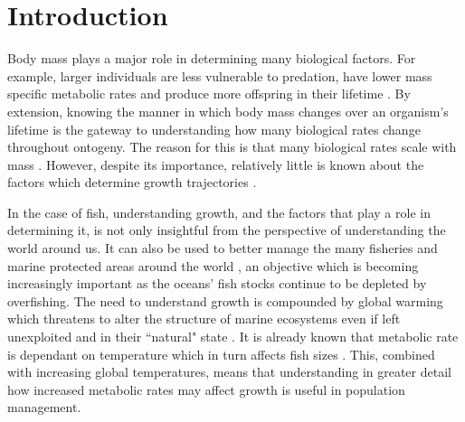 \documentclass[a4paper, 11pt, hidelinks]{article} %
\begin{document}
	
	\tableofcontents
	\newpage
	\linenumbers
\section{Introduction}


	Body mass plays a major role in determining many biological factors.  For example, larger individuals are less vulnerable to predation, have lower mass specific metabolic rates and produce more offspring in their lifetime \parencite{Peters1983, Barneche2018, Craig2006, Magnhagen2001, Hixon2014, Marshall2006}.
	By extension, knowing the manner in which body mass changes over an organism's lifetime is the gateway to understanding how many biological rates change throughout ontogeny.  The reason for this is that many biological rates scale with mass \parencite{Kleiber1932}.  However, despite its importance, relatively little is known about the factors which determine growth trajectories \parencite{Arendt2011, Marshall2019}.
	
	In the case of fish, understanding growth, and the factors that play a role in determining it, is not only insightful from the perspective of understanding the world around us.  It can also be used to better manage the many fisheries and marine protected areas around the world \parencite{Heino2013, Lester2009}, an objective which is becoming increasingly important as the oceans' fish stocks continue to be depleted by overfishing. 
	The need to understand growth is compounded by global warming which threatens to alter the structure of marine ecosystems even if left unexploited and in their ``natural" state \parencite{Bruno2018}.
	It is already known that metabolic rate is dependant on temperature which in turn affects fish sizes \parencite{Gillooly2001, Brown2004}.  This, combined with increasing global temperatures, means that understanding in greater detail how increased metabolic rates %
	may affect growth is useful in population management.
	
\end{document}
